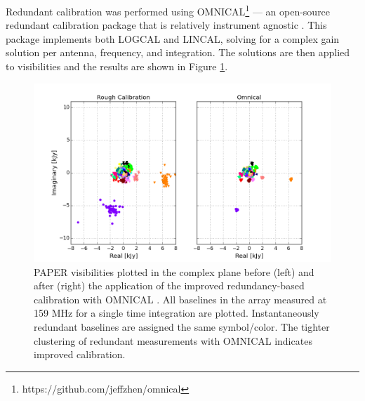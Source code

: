 \documentclass[twocolumn,numberedappendix]{emulateapj} \shorttitle{New Limits on the 21 cm Power Spectrum at $z=8.4$}
\begin{document}
%    
%       

Redundant calibration was performed using 
OMNICAL\footnote{https://github.com/jeffzhen/omnical} --- an open-source
redundant calibration package that is relatively instrument agnostic
\citep{zheng_et_al2014}. This package implements both LOGCAL
and LINCAL, solving for a complex gain solution per antenna, frequency, and
integration. The solutions are then applied to visibilities and the results are
shown in Figure \ref{fig:omniview}.

\begin{figure}
\centering
\includegraphics[width=1.5\columnwidth]{plots/omniview_64.png}
\caption{
PAPER visibilities plotted in the complex plane before (left) and
after (right) the 
application of the improved redundancy-based calibration with OMNICAL
\citep{zheng_et_al2014}.  All baselines in the array measured at 159 MHz for a
single time integration are plotted.  Instantaneously redundant baselines are
assigned the same symbol/color.  The tighter clustering of redundant
measurements with OMNICAL indicates improved calibration.
} 
\label{fig:omniview}
\end{figure}
\end{document}
